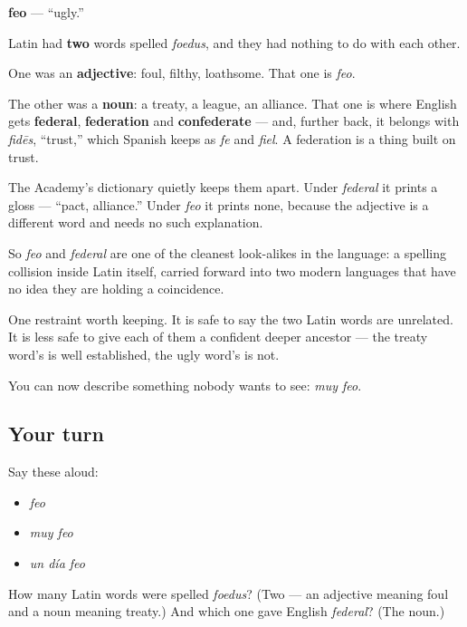 \begin{cousinweb}
\textbf{feo} — \textquotedblleft{}ugly.\textquotedblright{}

Latin had \textbf{two} words spelled \emph{foedus}, and they had nothing to do with each other.

One was an \textbf{adjective}: foul, filthy, loathsome. That one is \emph{feo}.

The other was a \textbf{noun}: a treaty, a league, an alliance. That one is where English gets \textbf{federal}, \textbf{federation} and \textbf{confederate} — and, further back, it belongs with \emph{fidēs}, \textquotedblleft{}trust,\textquotedblright{} which Spanish keeps as \emph{fe} and \emph{fiel}. A federation is a thing built on trust.

The Academy's dictionary quietly keeps them apart. Under \emph{federal} it prints a gloss — \textquotedblleft{}pact, alliance.\textquotedblright{} Under \emph{feo} it prints none, because the adjective is a different word and needs no such explanation.

So \emph{feo} and \emph{federal} are one of the cleanest look-alikes in the language: a spelling collision inside Latin itself, carried forward into two modern languages that have no idea they are holding a coincidence.

One restraint worth keeping. It is safe to say the two Latin words are unrelated. It is less safe to give each of them a confident deeper ancestor — the treaty word's is well established, the ugly word's is not.
\end{cousinweb}

\begin{grammarlens}[title={What you've built}]
You can now describe something nobody wants to see: \emph{muy feo}.
\end{grammarlens}

\subsection*{Your turn}
Say these aloud:

\begin{itemize}
\raggedright
  \item \emph{feo}
  \item \emph{muy feo}
  \item \emph{un día feo}
\end{itemize}

\begin{tcolorbox}[breakable,colback=teal!4,colframe=teal!35!black,title={Before you move on}]
How many Latin words were spelled \emph{foedus}? (Two — an adjective meaning foul and a noun meaning treaty.) And which one gave English \emph{federal}? (The noun.)
\end{tcolorbox}
